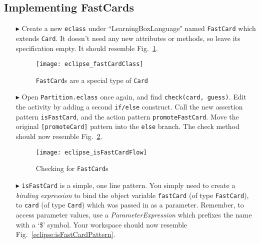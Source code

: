 \newpage
\subsection{Implementing FastCards}
\texHeader
\hypertarget{fastCard tex}{}

\begin{itemize}
  
\item[$\blacktriangleright$] Create a new \texttt{eclass} under ``LearningBoxLanguage" named \texttt{FastCard} which extends \texttt{Card}. It doesn't need any
new attributes or methods, so leave its specification empty. It should resemble Fig.~\ref{eclipse:fastClass}.

\vspace{0.5cm}

\begin{figure}[htp]
\begin{center}
  \texttt{[image: eclipse\_fastCardClass]}
  \caption{\texttt{FastCard}s are a special type of \texttt{Card}}
  \label{eclipse:fastClass}
\end{center}
\end{figure}

\item[$\blacktriangleright$] Open \texttt{Partition.eclass} once again, and find \texttt{check(card, guess)}. Edit the activity by adding a second
\texttt{if/else} construct. Call the new assertion pattern \texttt{isFastCard}, and the action pattern \texttt{promoteFastCard}. Move the original
\texttt{[promoteCard]} pattern into the \texttt{else} branch. The check method should now resemble Fig.~\ref{eclipse:isFastCard}.

\vspace{0.5cm}

\begin{figure}[htp]
\begin{center}
  \texttt{[image: eclipse\_isFastCardFlow]}
  \caption{Checking for \texttt{FastCard}s}
  \label{eclipse:isFastCard}
\end{center}
\end{figure}

\item[$\blacktriangleright$] \texttt{isFastCard} is a simple, one line pattern. You simply need to create a \emph{binding expression} to bind the
object variable \texttt{fastCard} (of type \texttt{FastCard}), to \texttt{card} (of type \texttt{Card}) which was passed in as a parameter. Remember, to access
parameter values, use a \emph{ParameterExpression} which prefixes the name with a `\$' symbol. Your workspace should now resemble
Fig.~\ref{eclipse:isFastCardPattern}.


\end{itemize}
